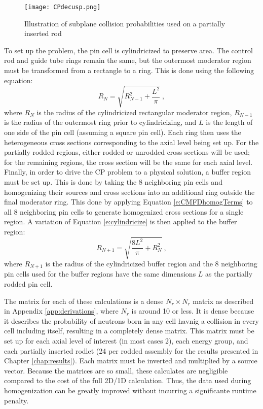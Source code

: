 \begin{figure}
    \centering
    \texttt{[image: CPdecusp.png]}
    \caption[Subplane Collision Probabilities Illustration]{Illustration of subplane collision probabilities used on a partially inserted rod}\label{f:SCPdecusping}
\end{figure}

To set up the problem, the pin cell is cylindricized to preserve area.  The control rod and guide tube rings remain the same, but the outermost moderator region must be transformed from a rectangle to a ring.  This is done using the following equation:
\begin{equation}\label{e:cylindricize}
R_N = \sqrt{R_{N-1}^2 + \frac{L^2}{\pi}}\ ,
\end{equation}
where $R_N$ is the radius of the cylindricized rectangular moderator region, $R_{N-1}$ is the radius of the outermost ring prior to cylindricizing, and $L$ is the length of one side of the pin cell (assuming a square pin cell).  Each ring then uses the heterogeneous cross sections corresponding to the axial level being set up.  For the partially rodded regions, either rodded or unrodded cross sections will be used; for the remaining regions, the cross section will be the same for each axial level.  Finally, in order to drive the CP problem to a physical solution, a buffer region must be set up.  This is done by taking the 8 neighboring pin cells and homogenizing their sources and cross sections into an additional ring outside the final moderator ring.  This done by applying Equation \ref{e:CMFDhomogTerms} to all 8 neighboring pin cells to generate homogenized cross sections for a single region.  A variation of Equation \ref{e:cylindricize} is then applied to the buffer region:
\begin{equation}\label{e:cylindricizeBuffer}
R_{N+1} = \sqrt{\frac{8 L^2}{\pi} + R_N^2}\ ,
\end{equation}
where $R_{N+1}$ is the radius of the cylindricized buffer region and the 8 neighboring pin cells used for the buffer regions have the same dimensions $L$ as the partially rodded pin cell.

The matrix for each of these calculations is a dense $N_r \times N_r$ matrix as described in Appendix \ref{app:derivations}, where $N_r$ is around 10 or less.  It is dense because it describes the probability of neutrons born in any cell havnig a collision in every cell including itself, resulting in a completely dense matrix.  This matrix must be set up for each axial level of interest (in most cases 2), each energy group, and each partially inserted rodlet (24 per rodded assembly for the results presented in Chapter \ref{chap:results}).  Each matrix must be inverted and multiplied by a source vector.  Because the matrices are so small, these calculates are negligible compared to the cost of the full 2D/1D calculation.  Thus, the data used during homogenization can be greatly improved without incurring a significante runtime penalty.

